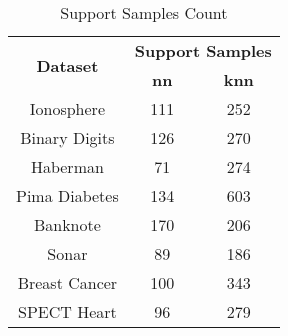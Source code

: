 \begin{table}[htbp]
\caption{Support Samples Count}
\begin{center}
\begin{tabular}{|c|c|c|}
\hline
\multirow{2}{*}{\textbf{Dataset}} & \multicolumn{2}{c|}{\textbf{Support Samples}} \\ \cline{2-3}
 & \textbf{nn} & \textbf{knn} \\ \hline
Ionosphere & 111 & 252 \\ \hline
Binary Digits & 126 & 270 \\ \hline
Haberman & 71 & 274 \\ \hline
Pima Diabetes & 134 & 603 \\ \hline
Banknote & 170 & 206 \\ \hline
Sonar & 89 & 186 \\ \hline
Breast Cancer & 100 & 343 \\ \hline
SPECT Heart & 96 & 279 \\ \hline
\end{tabular}
\label{tab:support}
\end{center}
\end{table}